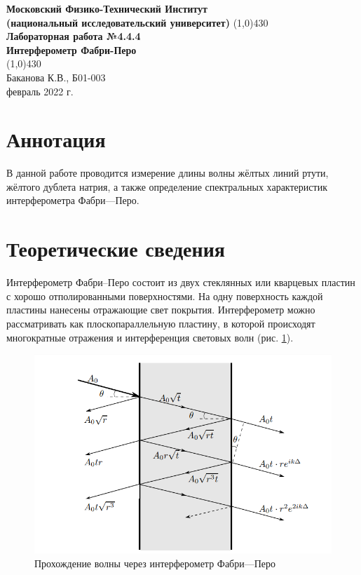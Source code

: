 \documentclass[a4paper, 12pt]{article}%
\begin{document}
\begin{titlepage}

\begin{center}
\large\textbf{Московский Физико-Технический Институт}\\
\large\textbf{(национальный исследовательский университет)}
\vfill
\line(1,0){430}\\[3mm]
\huge\textbf{Лабораторная работа №4.4.4}\\
\large\textbf{Интерферометр Фабри-Перо}\\
\line(1,0){430}\\[1mm]
\vfill
\large Баканова К.В., Б01-003\\
\large февраль 2022 г.\\
\end{center}

\end{titlepage}




\section{Аннотация}
В данной работе проводится измерение длины волны жёлтых линий ртути, жёлтого дублета натрия, а также определение спектральных характеристик интерферометра Фабри—Перо. 


\section{Теоретические сведения}

Интерферометр Фабри–Перо состоит из двух стеклянных или кварцевых пластин с хорошо отполированными поверхностями. На одну поверхность каждой пластины нанесены отражающие свет покрытия. Интерферометр можно рассматривать как плоскопараллельную пластину, в которой происходят многократные отражения и интерференция световых волн (рис. \ref{fig:reflections}). 

		\begin{figure}[h!]
		\centering
	\includegraphics[width=0.6\linewidth]{Screenshot_1.png}
	\caption{Прохождение волны через интерферометр Фабри---Перо}
	\label{fig:reflections}
\end{figure}
\end{document}
